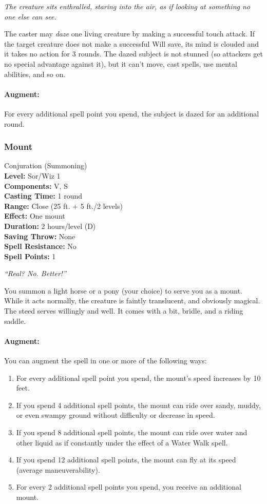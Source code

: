 \emph{The creature sits enthralled, staring into the air, as if looking at something no one else can see.}

The caster may \emph{daze} one living creature by making a successful touch attack. 
If the target creature does not make a successful Will save, its mind is clouded and it takes no action for 3 rounds. 
The dazed subject is not stunned (so attackers get no special advantage against it), but it can't move, cast spells, use mental abilities, and so on.

\paragraph{Augment:} For every additional spell point you spend, the subject is dazed for an additional round.
\subsubsection{Mount}
\label{Spell:Mount}
Conjuration (Summoning)
\\ \textbf{Level:} Sor/Wiz 1
\\ \textbf{Components:} V, S
\\ \textbf{Casting Time:} 1 round
\\ \textbf{Range:} Close (25 ft. + 5 ft./2 levels)
\\ \textbf{Effect:} One mount
\\ \textbf{Duration:} 2 hours/level (D)
\\ \textbf{Saving Throw:} None
\\ \textbf{Spell Resistance:} No
\\ \textbf{Spell Points:} 1

\emph{``Real? No. Better!''}

You summon a light horse or a pony (your choice) to serve you as a mount. While it acts normally, the creature is faintly translucent, and obviously magical.
The steed serves willingly and well. It comes with a bit, bridle, and a riding saddle.

\paragraph{Augment:} You can augment the spell in one or more of the following ways:
\begin{enumerate}
 \item For every additional spell point you spend, the mount's speed increases by 10 feet.
 \item If you spend 4 additional spell points, the mount can ride over sandy, muddy, or even swampy ground without difficulty or decrease in speed.
 \item If you spend 8 additional spell points, the mount can ride over water and other liquid as if constantly under the effect of a 
 Water Walk spell.
 \item If you spend 12 additional spell points, the mount can fly at its speed (average maneuverability).
 \item For every 2 additional spell points you spend, you receive an additional mount.
\end{enumerate}

